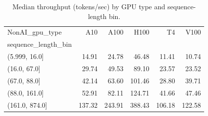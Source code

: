 \begin{table}[t]
\centering
\caption{Median throughput (tokens/sec) by GPU type and sequence-length bin.}
\label{tab:nonai_workload_seq_median_throughput}
\begin{tabular}{lrrrrr}
\toprule
NonAI_gpu_type & A10 & A100 & H100 & T4 & V100 \\
sequence_length_bin &  &  &  &  &  \\
\midrule
(5.999, 16.0] & 14.91 & 24.78 & 46.48 & 11.41 & 10.74 \\
(16.0, 67.0] & 29.74 & 49.53 & 89.10 & 23.57 & 23.52 \\
(67.0, 88.0] & 42.14 & 63.60 & 101.46 & 28.80 & 39.71 \\
(88.0, 161.0] & 52.91 & 82.11 & 124.71 & 41.66 & 47.46 \\
(161.0, 874.0] & 137.32 & 243.91 & 388.43 & 106.18 & 122.58 \\
\bottomrule
\end{tabular}

\end{table}
